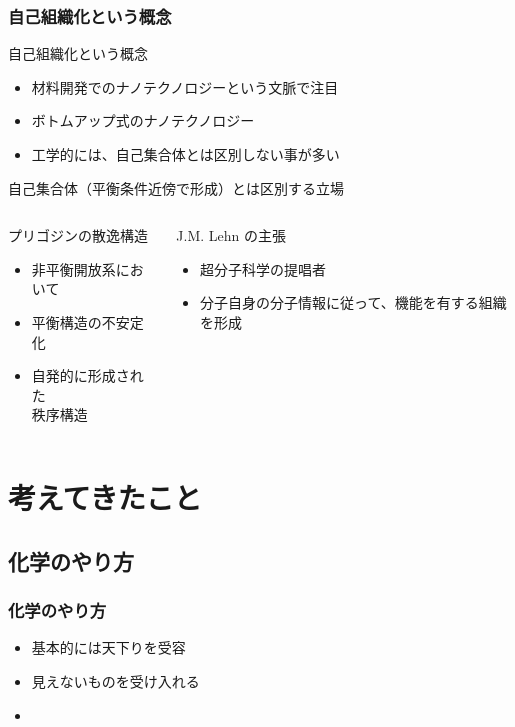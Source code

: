 \documentclass[12pt, dvipdfmx]{beamer}
\begin{document}
\begin{frame}
    \frametitle{自己組織化という概念}
    \begin{block}{自己組織化という概念}
        \begin{itemize}
            \item 材料開発でのナノテクノロジーという文脈で注目
            \item ボトムアップ式のナノテクノロジー
            \item 工学的には、自己集合体とは区別しない事が多い
        \end{itemize}
    \end{block}

    \begin{exampleblock}{自己集合体（平衡条件近傍で形成）とは区別する立場}
        \begin{columns}[T, onlytextwidth]
            \begin{alertblock}{プリゴジンの散逸構造}
                \begin{itemize}
                    \item 非平衡開放系において
                    \item 平衡構造の不安定化
                    \item 自発的に形成された\\秩序構造
                \end{itemize}
            \end{alertblock}
            \begin{alertblock}{J.M. Lehn の主張}
                \begin{itemize}
                    \item 超分子科学の提唱者
                    \item 分子自身の分子情報に従って、機能を有する組織を形成
                \end{itemize}
            \end{alertblock}
        \end{columns}
    \end{exampleblock}
\end{frame}

\section{考えてきたこと}
\subsection{化学のやり方}
\begin{frame}
    \frametitle{化学のやり方}
    \begin{itemize}
        \item 基本的には天下りを受容
        \item 見えないものを受け入れる
        \item 
    \end{itemize}
\end{frame}
    
\end{document}
